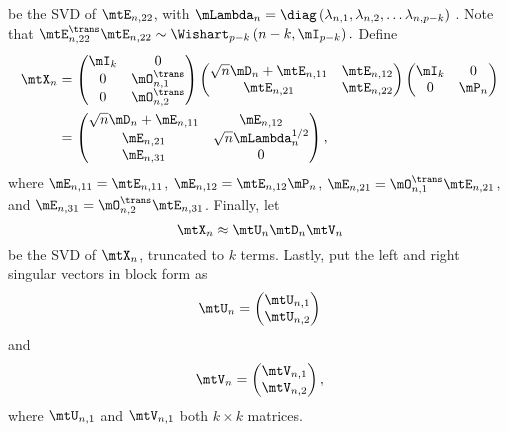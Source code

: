 be the SVD of $\mtE_{n,22}$, with
\(
    \mLambda_n
    =
    \diag \left(
        \lambda_{n,1}, 
        \lambda_{n,2}, 
        \ldots
        \lambda_{n,p-k}
    \right)
\)
.  Note that 
\(
    \mtE_{n,22}^\trans \mtE_{n,22}
    \sim
    \Wishart_{p-k} \left( n-k, \mI_{p-k} \right).
\)
Define
\begin{align*}
    \mtX_n
        &=
            \left(
            \begin{matrix}
                \mI_k & 0 \\
                0  & \mO_{n,1}^\trans \\
                0  & \mO_{n,2}^\trans
            \end{matrix}
            \right)
            \left(
            \begin{matrix}
                \sqrt{n} \mD_n + \mtE_{n,11} & \mtE_{n,12} \\
                \mtE_{n,21}                  & \mtE_{n,22}
            \end{matrix}
            \right)
            \left(
            \begin{matrix}
                \mI_k & 0 \\
                0     & \mP_n
            \end{matrix}
            \right) \\
        &=
            \left(
            \begin{matrix}
                \sqrt{n} \mD_n + \mE_{n,11} & \mE_{n,12} \\
                \mE_{n,21}                  & \sqrt{n} \mLambda^{1/2}_n \\
                \mE_{n,31}                  & 0
            \end{matrix}
            \right),
\end{align*}
where 
$\mE_{n,11} = \mtE_{n,11}$, 
$\mE_{n,12} = \mtE_{n,12} \mP_n$,
$\mE_{n,21} = \mO_{n,1}^\trans \mtE_{n,21}$, and
$\mE_{n,31} = \mO_{n,2}^\trans \mtE_{n,31}$.
Finally, let
\[
    \mtX_n
    \approx
    \mtU_n \mtD_n \mtV_n
\]
be the SVD of $\mtX_n$, truncated to $k$ terms.  Lastly, put the left and right singular vectors in block form as
\[
    \mtU_n
    =
    \left(
    \begin{matrix}
        \mtU_{n,1} \\
        \mtU_{n,2}
    \end{matrix}
    \right)
\]
and
\[
    \mtV_n
    =
    \left(
    \begin{matrix}
        \mtV_{n,1} \\
        \mtV_{n,2}
    \end{matrix}
    \right),
\]
where $\mtU_{n,1}$ and $\mtV_{n,1}$ both $k\times k$ matrices.


